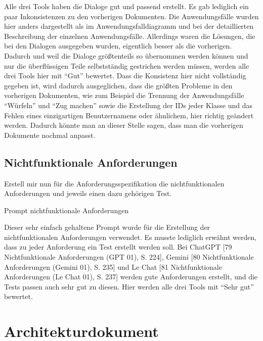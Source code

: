 Alle drei Tools haben die Dialoge gut und passend erstellt. Es gab lediglich ein paar Inkonsistenzen zu den vorherigen Dokumenten. Die 
Anwendungsfälle wurden hier anders dargestellt als im Anwendungsfalldiagramm und bei der detaillierten Beschreibung der einzelnen Anwendungsfälle. 
Allerdings waren die Lösungen, die bei den Dialogen ausgegeben wurden, eigentlich besser als die vorherigen. Dadurch und weil die Dialoge 
größtenteils so übernommen werden können und nur die überflüssigen Teile selbstständig gestrichen werden müssen, werden alle drei Tools hier 
mit ``Gut'' bewertet. Dass die Konsistenz hier nicht vollständig gegeben ist, wird dadurch ausgeglichen, dass die größten Probleme in den 
vorherigen Dokumenten, wie zum Beispiel die Trennung der Anwendungsfälle ``Würfeln'' und ``Zug machen'' sowie die Erstellung der IDs jeder Klasse 
und das Fehlen eines einzigartigen Benutzernamens oder ähnlichem, hier richtig geändert werden. Dadurch könnte man an dieser Stelle sagen, dass 
man die vorherigen Dokumente nochmal anpasst. 

\subsection*{Nichtfunktionale Anforderungen}

\begin{prompt}[H]
    \begin{tcolorbox}[colback=gray!20, colframe=gray!20, boxrule=0pt, sharp corners] 
        Erstell mir nun für die Anforderungsspezifikation die nichtfunktionalen Anforderungen und jeweils einen dazu gehörigen Test.
        \vfill
    \end{tcolorbox}
    \caption{Prompt nichtfunktionale Anforderungen}
    \label{Prompt nichtfunktionale Anforderungen}
\end{prompt}

Dieser sehr einfach gehaltene Prompt wurde für die Erstellung der nichtfunktionalen Anforderungen verwendet. Es musste lediglich erwähnt werden, 
dass zu jeder Anforderung ein Test erstellt werden soll. Bei ChatGPT [79 Nichtfunktionale Anforderungen (GPT 01), S. 224], Gemini [80 Nichtfunktionale Anforderungen (Gemini 01), S. 235] 
und Le Chat [81 Nichtfunktionale Anforderungen (Le Chat 01), S. 237] werden gute Anforderungen erstellt, und die 
Tests passen auch sehr gut zu diesen. Hier werden alle drei Tools mit ``Sehr gut'' bewertet.

\section{Architekturdokument}  \label{CompArchitekturdokument}

